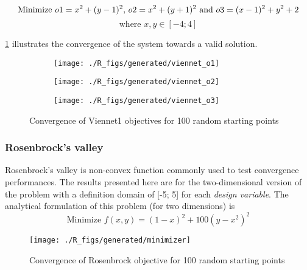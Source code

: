 $$\text{Minimize } o1 = x^2 + (y-1)^2 \text{, } o2 = x^2 + (y+1)^2 \text{ and } o3 = (x-1)^2 + y^2 +2\\$$
$$\text{where } x, y \in  [-4;4]
$$

\figurename \ref{viennet_res} illustrates the convergence of the system towards a valid solution.


\begin{figure}[h]

	\begin{subfigure}[b]{0.32\textwidth}
		\centering
		\texttt{[image: ./R\_figs/generated/viennet\_o1]}	
	\end{subfigure}
	\hfill%
	\begin{subfigure}[b]{0.32\textwidth}
		\centering
		\texttt{[image: ./R\_figs/generated/viennet\_o2]}	
	\end{subfigure}
	\hfill%
	\begin{subfigure}[b]{0.32\textwidth}
		\centering
		\texttt{[image: ./R\_figs/generated/viennet\_o3]}	
	\end{subfigure}
	\caption{Convergence of Viennet1 objectives for 100 random starting points}
	\label{viennet_res}
\end{figure}

\subsubsection{Rosenbrock's valley}

Rosenbrock's valley is non-convex function commonly used to test convergence performances. The results presented here are for the two-dimensional version of the problem with a definition domain of [-5; 5] for each \emph{design variable}.
The analytical formulation of this problem (for two dimensions) is 
$$\text{Minimize } f(x,y) = (1-x)^2 + 100(y - x^2)^2$$

\begin{wrapfigure}{R}{0.5\textwidth}
    \texttt{[image: ./R\_figs/generated/minimizer]}	
	\caption{Convergence of Rosenbrock objective for 100 random starting points}
	\vspace{-20pt}
\end{wrapfigure}